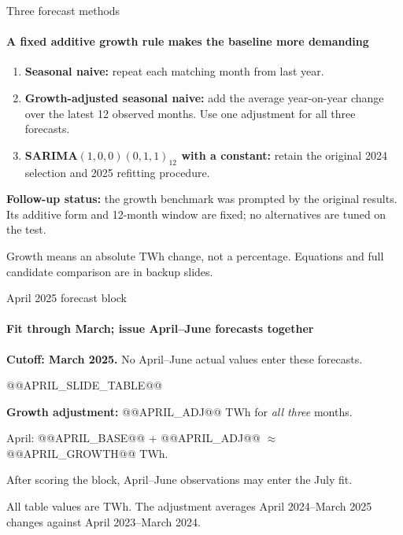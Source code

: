 \documentclass[aspectratio=169,10pt]{beamer}
\newcommand{\Source}[1]{\par\vfill{\fontsize{6.5}{7.5}\selectfont\color{black!65}#1\par}}
\begin{document}
\begin{frame}[t]{Three forecast methods}
\framesubtitle{A fixed additive growth rule makes the baseline more demanding}
\begin{enumerate}
\item \textbf{Seasonal naive:} repeat each matching month from last year.
\item \textbf{Growth-adjusted seasonal naive:} add the average year-on-year change over the latest 12 observed months. Use one adjustment for all three forecasts.
\item \textbf{SARIMA$(1,0,0)(0,1,1)_{12}$ with a constant:} retain the original 2024 selection and 2025 refitting procedure.
\end{enumerate}
\par\medskip
\textbf{Follow-up status:} the growth benchmark was prompted by the original results. Its additive form and 12-month window are fixed; no alternatives are tuned on the test.
\Source{Growth means an absolute TWh change, not a percentage. Equations and full candidate comparison are in backup slides.}
\end{frame}

\begin{frame}[t]{April 2025 forecast block}
\framesubtitle{Fit through March; issue April--June forecasts together}
\textbf{Cutoff: March 2025.} No April--June actual values enter these forecasts.
\begin{center}
@@APRIL_SLIDE_TABLE@@
\end{center}
\textbf{Growth adjustment:} @@APRIL_ADJ@@ TWh for \emph{all three} months.\par
April: @@APRIL_BASE@@ + @@APRIL_ADJ@@ $\approx$ @@APRIL_GROWTH@@ TWh.
\par\medskip\par
After scoring the block, April--June observations may enter the July fit.
\Source{All table values are TWh. The adjustment averages April 2024--March 2025 changes against April 2023--March 2024.}
\end{frame}
\end{document}
